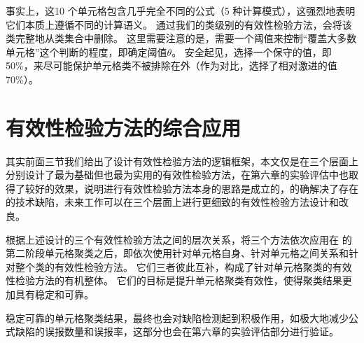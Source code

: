 事实上，这10 个单元格包含几乎完全不同的公式（5 种计算模式），这强烈地表明它们本质上遵循不同的计算语义。
通过我们的类级别的有效性检验方法，\wa 会将该类完整地从类集合中删除。
这里需要注意的是，\wa 需要一个阈值来控制“覆盖大多数单元格”这个判断的程度，即确定阈值$\theta$。
安全起见，\wa 选择一个保守的值，即 50\%，来尽可能保护单元格类不被排除在外（作为对比，\ca 选择了相对激进的值70\%）。


\section{有效性检验方法的综合应用}
其实前面三节我们给出了设计有效性检验方法的逻辑框架，本文仅是在三个层面上分别设计了最为基础但也最为实用的有效性检验方法，在第六章的实验评估中也取得了较好的效果，说明进行有效性检验方法本身的思路是成立的，的确解决了\cu 存在的技术缺陷，未来工作可以在三个层面上进行更细致的有效性检验方法设计和改良。

根据上述设计的三个有效性检验方法之间的层次关系，\wa 将三个方法依次应用在 \cu 的第二阶段单元格聚类之后，即依次使用针对单元格自身、针对单元格之间关系和针对整个类的有效性检验方法。
它们三者彼此互补，构成了针对单元格聚类的有效性检验方法的有机整体。
它们的目标是提升单元格聚类有效性，使得聚类结果更加具有稳定和可靠。

稳定可靠的单元格聚类结果，最终也会对缺陷检测起到积极作用，如极大地减少公式缺陷的误报数量和误报率，这部分也会在第六章的实验评估部分进行验证。